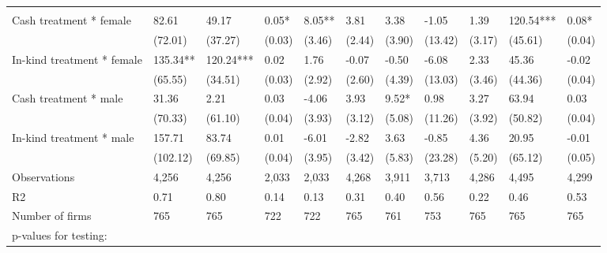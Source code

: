 \begin{table}[H]
{\begin{tabular}{lllllllllll}
\cmidrule(l{3pt}r{3pt}){2-2} \cmidrule(l{3pt}r{3pt}){3-3} \cmidrule(l{3pt}r{3pt}){4-4} \cmidrule(l{3pt}r{3pt}){5-5} \cmidrule(l{3pt}r{3pt}){6-6} \cmidrule(l{3pt}r{3pt}){7-7} \cmidrule(l{3pt}r{3pt}){8-8} \cmidrule(l{3pt}r{3pt}){9-9} \cmidrule(l{3pt}r{3pt}){10-10} \cmidrule(l{3pt}r{3pt}){11-11}
\addlinespace[0.3em]
\multicolumn{11}{l}{\textbf{Panel A: Males and females}}\\
\hspace{1em}Cash treatment * female & 82.61 & 49.17 & 0.05* & 8.05** & 3.81 & 3.38 & -1.05 & 1.39 & 120.54*** & 0.08*\\
\hspace{1em} & (72.01) & (37.27) & (0.03) & (3.46) & (2.44) & (3.90) & (13.42) & (3.17) & (45.61) & (0.04)\\
\hspace{1em}In-kind treatment * female & 135.34** & 120.24*** & 0.02 & 1.76 & -0.07 & -0.50 & -6.08 & 2.33 & 45.36 & -0.02\\
\hspace{1em} & (65.55) & (34.51) & (0.03) & (2.92) & (2.60) & (4.39) & (13.03) & (3.46) & (44.36) & (0.04)\\
\hspace{1em}Cash treatment * male & 31.36 & 2.21 & 0.03 & -4.06 & 3.93 & 9.52* & 0.98 & 3.27 & 63.94 & 0.03\\
\hspace{1em} & (70.33) & (61.10) & (0.04) & (3.93) & (3.12) & (5.08) & (11.26) & (3.92) & (50.82) & (0.04)\\
\hspace{1em}In-kind treatment * male & 157.71 & 83.74 & 0.01 & -6.01 & -2.82 & 3.63 & -0.85 & 4.36 & 20.95 & -0.01\\
\hspace{1em} & (102.12) & (69.85) & (0.04) & (3.95) & (3.42) & (5.83) & (23.28) & (5.20) & (65.12) & (0.05)\\
\hspace{1em}Observations & 4,256 & 4,256 & 2,033 & 2,033 & 4,268 & 3,911 & 3,713 & 4,286 & 4,495 & 4,299\\
\hspace{1em}R2 & 0.71 & 0.80 & 0.14 & 0.13 & 0.31 & 0.40 & 0.56 & 0.22 & 0.46 & 0.53\\
\hspace{1em}Number of firms & 765 & 765 & 722 & 722 & 765 & 761 & 753 & 765 & 765 & 765\\
\hspace{1em}p-values for testing: &  &  &  &  &  &  &  &  &  \vphantom{1}& \\

\end{tabular}}
\end{table}
